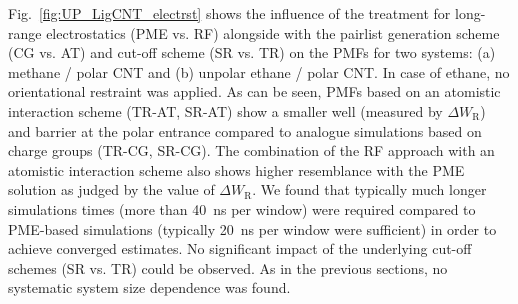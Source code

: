 \documentclass[9pt,lessons,pubversion]{livecoms}
\begin{document}
Fig.~\ref{fig:UP_LigCNT_electrst} shows the influence of the treatment for long-range electrostatics (PME vs. RF) 
alongside with the pairlist generation scheme (CG vs. AT) and cut-off scheme (SR vs. TR) on the PMFs for two systems: (a) methane / polar CNT and (b) unpolar ethane / polar CNT. 
In case of ethane, no orientational restraint was applied. 
As can be seen, PMFs based on an atomistic interaction scheme (TR-AT, SR-AT) show a smaller well (measured by $\Delta W_\mathrm{R}$) and barrier at the polar entrance 
compared to analogue simulations based on charge groups (TR-CG, SR-CG).
The combination of the RF approach with an atomistic interaction scheme also shows higher resemblance with the PME solution as judged by the value of $\Delta W_\mathrm{R}$.
We found that typically much longer simulations times (more than 40~ns per window) were required compared to PME-based simulations (typically 20~ns per window were sufficient) in order to achieve converged estimates. 
No significant impact of the underlying cut-off schemes (SR vs. TR) could be observed.
As in the previous sections, no systematic system size dependence was found.
\end{document}
